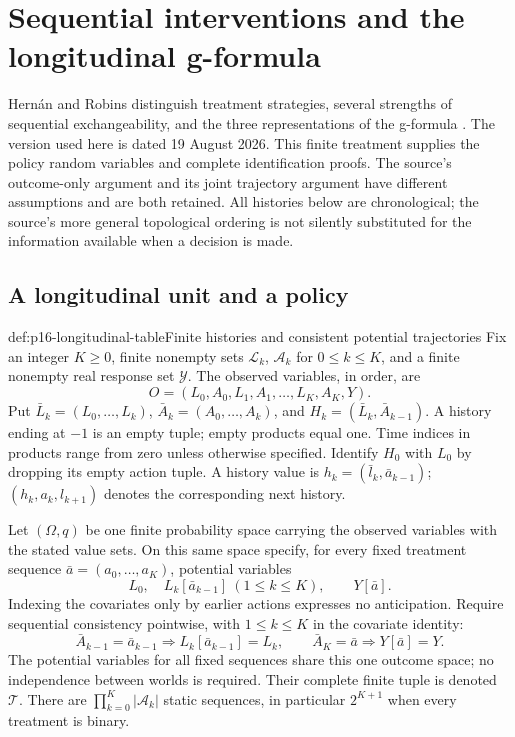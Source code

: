 \section{Sequential interventions and the longitudinal g-formula}
\label{sec:p16-sequential-g-formula}

Hern\'an and Robins distinguish treatment strategies, several strengths of
sequential exchangeability, and the three representations of the g-formula
\cite[Chs.~19--20, Secs.~21.1--21.2 and Fine Point~21.2,
pp.~255--285, 291]{HernanRobins2020WhatIf2026}.
The version used here is dated 19 August 2026. This finite treatment supplies
the policy random variables and complete identification proofs. The source's
outcome-only argument and its joint trajectory argument have different
assumptions and are both retained. All histories below are chronological;
the source's more general topological ordering is not silently substituted
for the information available when a decision is made.

\subsection{A longitudinal unit and a policy}

\begin{hbdefinition}{def:p16-longitudinal-table}{Finite histories and consistent potential trajectories}
Fix an integer \(K\geq0\), finite nonempty sets \(\mathcal L_k\),
\(\mathcal A_k\) for \(0\leq k\leq K\), and a finite nonempty real
response set \(\mathcal Y\). The observed variables, in order, are
\[
 O=(L_0,A_0,L_1,A_1,\ldots,L_K,A_K,Y).
\]
Put \(\bar L_k=(L_0,\ldots,L_k)\),
\(\bar A_k=(A_0,\ldots,A_k)\), and
\(H_k=(\bar L_k,\bar A_{k-1})\). A history ending at \(-1\)
is an empty tuple; empty products equal one. Time indices in products
range from zero unless otherwise specified. Identify \(H_0\) with \(L_0\)
by dropping its empty action tuple. A history value is
\(h_k=(\bar l_k,\bar a_{k-1})\);
\((h_k,a_k,l_{k+1})\) denotes the corresponding next history.

Let \((\Omega,q)\) be one finite probability space carrying the observed
variables with the stated value sets. On this same space specify, for
every fixed treatment sequence
\(\bar a=(a_0,\ldots,a_K)\), potential variables
\[
 L_0,\quad L_k[\bar a_{k-1}]\ (1\leq k\leq K),\qquad Y[\bar a].
\]
Indexing the covariates only by earlier actions expresses no anticipation.
Require sequential consistency pointwise, with \(1\leq k\leq K\)
in the covariate identity:
\[
 \bar A_{k-1}=\bar a_{k-1}\Longrightarrow
 L_k[\bar a_{k-1}]=L_k,
 \qquad \bar A_K=\bar a\Longrightarrow Y[\bar a]=Y.
\]
The potential variables for all fixed sequences share this one outcome
space; no independence between worlds is required. Their complete finite
tuple is denoted \(\mathcal T\). There are
\(\prod_{k=0}^K|\mathcal A_k|\) static sequences, in particular
\(2^{K+1}\) when every treatment is binary.
\end{hbdefinition}

